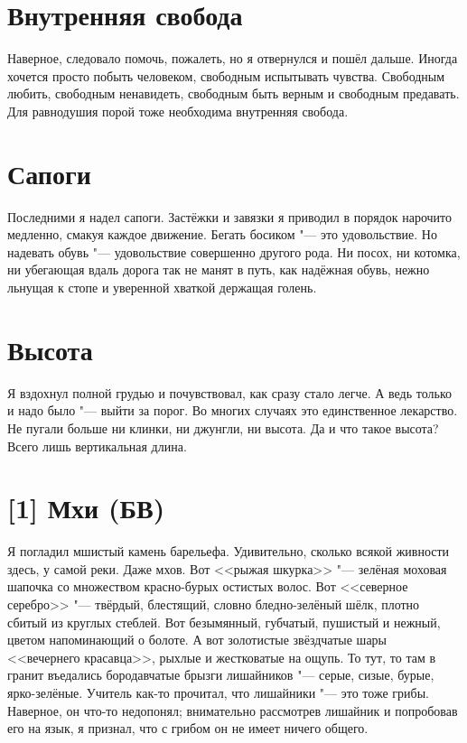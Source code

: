 \section{Внутренняя свобода}

Наверное, следовало помочь, пожалеть, но я отвернулся и пошёл дальше.
Иногда хочется просто побыть человеком, свободным испытывать чувства.
Свободным любить, свободным ненавидеть, свободным быть верным и свободным предавать.
Для равнодушия порой тоже необходима внутренняя свобода.

\section{Сапоги}

Последними я надел сапоги.
Застёжки и завязки я приводил в порядок нарочито медленно, смакуя каждое движение.
Бегать босиком "--- это удовольствие.
Но надевать обувь "--- удовольствие совершенно другого рода.
Ни посох, ни котомка, ни убегающая вдаль дорога так не манят в путь, как надёжная обувь, нежно льнущая к стопе и уверенной хваткой держащая голень.

\section{Высота}

Я вздохнул полной грудью и почувствовал, как сразу стало легче.
А ведь только и надо было "--- выйти за порог.
Во многих случаях это единственное лекарство.
Не пугали больше ни клинки, ни джунгли, ни высота.
Да и что такое высота?
Всего лишь вертикальная длина.

\section{[1] Мхи (БВ)}

Я погладил мшистый камень барельефа.
Удивительно, сколько всякой живности здесь, у самой реки.
Даже мхов.
Вот <<рыжая шкурка>> "--- зелёная моховая шапочка со множеством красно-бурых остистых волос.
Вот <<северное серебро>> "--- твёрдый, блестящий, словно бледно-зелёный шёлк, плотно сбитый из круглых стеблей.
Вот безымянный, губчатый, пушистый и нежный, цветом напоминающий о болоте.
А вот золотистые звёздчатые шары <<вечернего красавца>>, рыхлые и жестковатые на ощупь.
То тут, то там в гранит въедались бородавчатые брызги лишайников "--- серые, сизые, бурые, ярко-зелёные.
Учитель как-то прочитал, что лишайники "--- это тоже грибы.
Наверное, он что-то недопонял;
внимательно рассмотрев лишайник и попробовав его на язык, я признал, что с грибом он не имеет ничего общего.

